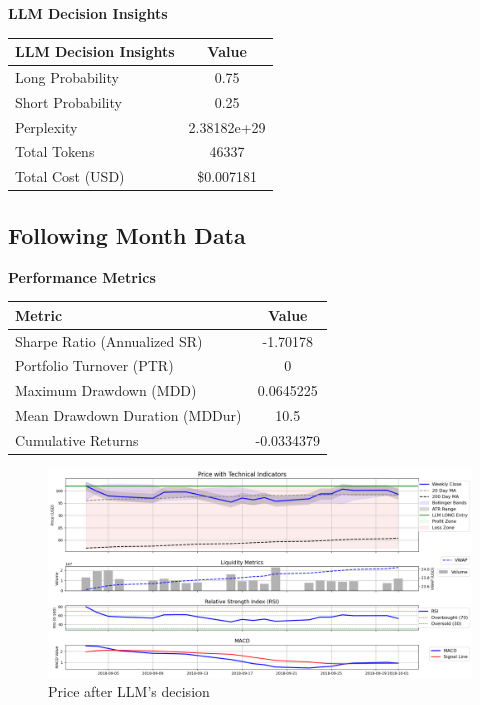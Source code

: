 \documentclass[8pt]{scrartcl}
\begin{document}
\textbf{LLM Decision Insights}

\begin{longtable}{l c}
\toprule
\textbf{LLM Decision Insights} & \textbf{Value} \\
\midrule
Long Probability & 0.75 \\
Short Probability & 0.25 \\
Perplexity & 2.38182e+29 \\
\midrule
Total Tokens & 46337 \\
Total Cost (USD) & \$0.007181 \\
\bottomrule
\end{longtable}

\subsection*{Following Month Data}

\textbf{Performance Metrics}

\begin{longtable}{l c}
\toprule
\textbf{Metric} & \textbf{Value} \\
\midrule
Sharpe Ratio (Annualized SR) & -1.70178 \\
Portfolio Turnover (PTR) & 0 \\
Maximum Drawdown (MDD) & 0.0645225 \\
Mean Drawdown Duration (MDDur) & 10.5 \\
Cumulative Returns & -0.0334379 \\
\bottomrule
\end{longtable}

\begin{figure}[H]
    \centering
    \includegraphics[width=1\linewidth]{judge_reviews//AMZN_M_gpt-4o-mini//2018-09-01/llm_Price_with_Technical_Indicators.png}
    \caption{Price after LLM's decision}
\end{figure}
\end{document}
